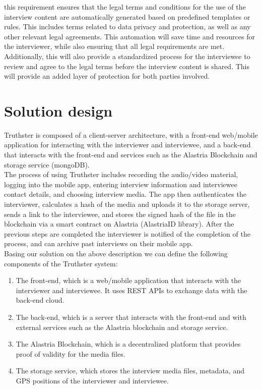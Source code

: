\documentclass[target=mst,aauheader=]{thud}
\begin{document}
\begin{itemize}
    this requirement ensures that the legal terms and conditions for the use of the interview content are automatically generated based on predefined templates or rules. This includes terms related to data privacy and protection, as well as any other relevant legal agreements. This automation will save time and resources for the interviewer, while also ensuring that all legal requirements are met. Additionally, this will also provide a standardized process for the interviewee to review and agree to the legal terms before the interview content is shared. This will provide an added layer of protection for both parties involved.

\end{itemize}

\chapter{Solution design}

Truthster is composed of a client-server architecture, with a front-end web/mobile application for interacting with the interviewer and interviewee, and a back-end that interacts with the front-end and services such as the Alastria Blockchain and storage service (mongoDB).\\
The process of using Truthster includes recording the audio/video material, logging into the mobile app, entering interview information and interviewee contact details, and choosing interview media. The app then authenticates the interviewer, calculates a hash of the media and uploads it to the storage server, sends a link to the interviewee, and stores the signed hash of the file in the blockchain via a smart contract on Alastria (AlastriaID library). After the previous steps are completed the interviewer is notified of the completion of the process, and can archive past interviews on their mobile app.\\
Basing our solution on the above description we can define the following components of the Truthster system:

\begin{enumerate}
    \item The front-end, which is a web/mobile application that interacts with the interviewer and interviewee. It uses REST APIs to exchange data with the back-end cloud.
    
    \item The back-end, which is a server that interacts with the front-end and with external services such as the Alastria blockchain and storage service.

    \item The Alastria Blockchain, which is a decentralized platform that provides proof of validity for the media files.

    \item The storage service, which stores the interview media files, metadata, and GPS positions of the interviewer and interviewee.
    
\end{enumerate}
\end{document}
